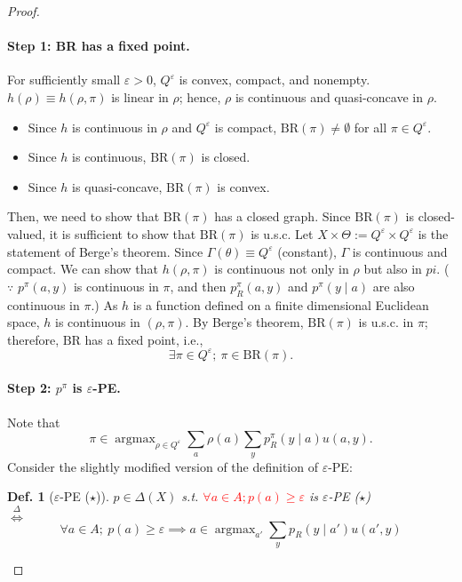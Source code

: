 \documentclass[11pt,a4paper,dvipdfmx]{article}
\theoremstyle{plain}
\newtheorem{df}{Def.}[section]
\renewcommand{\epsilon}{\varepsilon}
\newcommand{\defi}{\stackrel{\Delta}{\Longleftrightarrow}}
\DeclareMathOperator*{\argmax}{argmax}
\newcommand{\ocomment}[1]{{\textcolor{red}{#1}}}
\begin{document}
\begin{proof}
	\paragraph{Step 1: BR has a fixed point.}
	For sufficiently small $\epsilon > 0$, $Q^\epsilon$ is convex, compact, and nonempty.
	$h(\rho) \equiv h(\rho, \pi)$ is linear in $\rho$; hence, $\rho$ is continuous and quasi-concave in $\rho$.
	
	\begin{itemize}
		\item Since $h$ is continuous in $\rho$ and $Q^\epsilon$ is compact, $\text{BR}(\pi) \neq \emptyset$ for all $\pi \in Q^\epsilon$.
		\item Since $h$ is continuous, $\text{BR}(\pi)$ is closed.
		\item Since $h$ is quasi-concave, $\text{BR}(\pi)$ is convex.
	\end{itemize}
	Then, we need to show that $\text{BR}(\pi)$ has a closed graph. Since $\text{BR}(\pi)$ is closed-valued,  it is sufficient to show that $\text{BR}(\pi)$ is u.s.c.
	Let $X \times \Theta := Q^\epsilon \times Q^\epsilon$ is the statement of Berge's theorem. Since $\Gamma(\theta) \equiv Q^\epsilon$ (constant), $\Gamma$ is continuous and compact. We can show that $h(\rho, \pi)$ is continuous not only in $\rho$ but also in $pi$. ($\because$ $p^\pi(a, y)$ is continuous in $\pi$, and then $p^\pi_R(a, y)$ and $p^\pi(y \mid a)$ are also continuous in $\pi$.) As $h$ is a function defined on a finite dimensional Euclidean space, $h$ is continuous in $(\rho, \pi)$. By Berge's theorem, $\text{BR}(\pi)$ is u.s.c. in $\pi$; therefore, $\text{BR}$ has a fixed point, i.e., 
	\[
	\exists \pi \in Q^\epsilon; \ \pi \in \text{BR}(\pi).
	\]
	
	\paragraph{Step 2: $p^\pi$ is $\epsilon$-PE.}
	Note that
	\[
	\pi \in
	\argmax_{\rho \in Q^\epsilon}
	\sum_a \rho(a) \sum_y p_R^\pi (y \mid a) u(a, y).
	\]
	Consider the slightly modified version of the definition of $\epsilon$-PE:
	\begin{df}[$\epsilon$-PE ($\star$)]
		$p \in \Delta(X)$ s.t. \ocomment{$\forall a \in A; p(a) \geq \epsilon$} is $\epsilon$-PE ($\star$) \\
		$\defi$
		\begin{equation}
		\forall a \in A; \ p(a) \geq \epsilon \implies
		a \in \argmax_{a'} \sum_y p_R(y \mid a')u(a', y) \label{pe-star}
		\end{equation}
	\end{df}
	

\end{proof}
\end{document}
